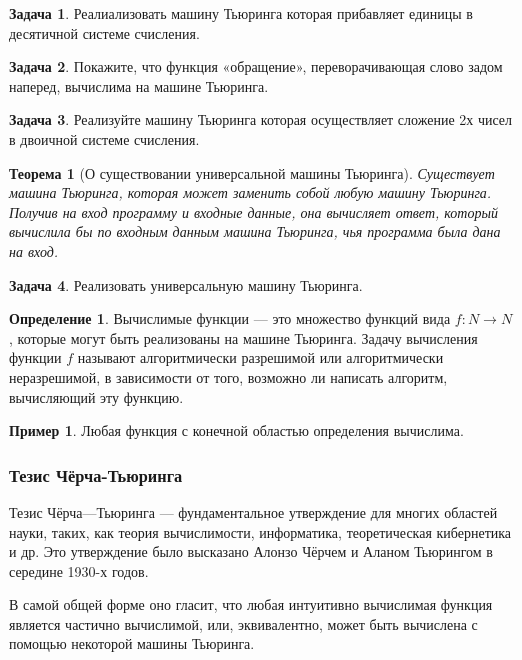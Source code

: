 \documentclass[10pt,twoside]{article}
\theoremstyle{plain}
\newtheorem{thm}{Теорема}
\theoremstyle{definition}
\newtheorem{defi}{Определение}
\newtheorem*{example}{Пример}
\newtheorem{problem}{Задача}
\begin{document}
\begin{problem}
  Реалиализовать машину Тьюринга которая прибавляет единицы в десятичной системе счисления.
\end{problem}

\begin{problem}
  Покажите, что функция «обращение», переворачивающая слово задом наперед, вычислима на машине Тьюринга.
\end{problem}

\begin{problem}
  Реализуйте машину Тьюринга которая осуществляет сложение 2х чисел в двоичной системе счисления.
\end{problem}

\begin{thm}[О существовании универсальной машины Тьюринга]
  Существует машина Тьюринга, которая может заменить собой любую машину Тьюринга. Получив на вход программу и входные данные, она вычисляет ответ, который вычислила бы по входным данным машина Тьюринга, чья программа была дана на вход.
\end{thm}

\begin{problem}
  Реализовать универсальную машину Тьюринга.
\end{problem}

\begin{defi}
  Вычислимые функции — это множество функций вида $f\colon N\to N$, которые могут быть реализованы на машине Тьюринга. Задачу вычисления функции $f$ называют алгоритмически разрешимой или алгоритмически неразрешимой, в зависимости от того, возможно ли написать алгоритм, вычисляющий эту функцию.
\end{defi}

\begin{example}
  Любая функция с конечной областью определения вычислима.
\end{example}

\subsubsection{Тезис Чёрча-Тьюринга}

Тезис Чёрча—Тьюринга — фундаментальное утверждение для многих областей науки, таких, как теория вычислимости, информатика, теоретическая кибернетика и др. Это утверждение было высказано Алонзо Чёрчем и Аланом Тьюрингом в середине 1930-х годов.

В самой общей форме оно гласит, что любая интуитивно вычислимая функция является частично вычислимой, или, эквивалентно, может быть вычислена с помощью некоторой машины Тьюринга.
\end{document}

